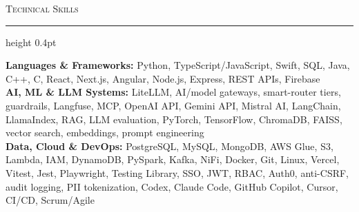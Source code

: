 \documentclass[letterpaper,11pt]{article}
\newcommand{\resumesection}[1]{%
  \par\vspace{2pt}%
  {\large\scshape #1}\par\vspace{2pt}%
  \hrule height 0.4pt\vspace{2pt}%
}
\begin{document}
\resumesection{Technical Skills}
\textbf{Languages \& Frameworks:} Python, TypeScript/JavaScript, Swift, SQL, Java, C++, C, React, Next.js, Angular, Node.js, Express, REST APIs, Firebase\\
\textbf{AI, ML \& LLM Systems:} LiteLLM, AI/model gateways, smart-router tiers, guardrails, Langfuse, MCP, OpenAI API, Gemini API, Mistral AI, LangChain, LlamaIndex, RAG, LLM evaluation, PyTorch, TensorFlow, ChromaDB, FAISS, vector search, embeddings, prompt engineering\\
\textbf{Data, Cloud \& DevOps:} PostgreSQL, MySQL, MongoDB, AWS Glue, S3, Lambda, IAM, DynamoDB, PySpark, Kafka, NiFi, Docker, Git, Linux, Vercel, Vitest, Jest, Playwright, Testing Library, SSO, JWT, RBAC, Auth0, anti-CSRF, audit logging, PII tokenization, Codex, Claude Code, GitHub Copilot, Cursor, CI/CD, Scrum/Agile
\end{document}
